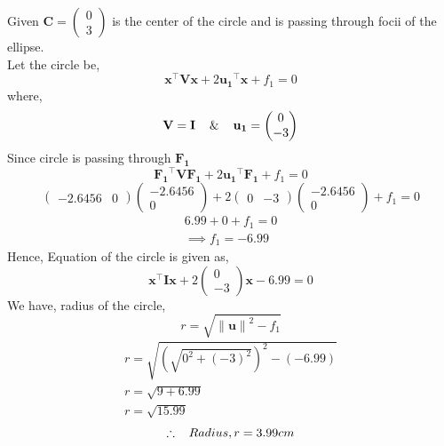 \documentclass[journal,10pt,twocolumn]{article}
\providecommand{\norm}[1]{\left\lVert#1\right\rVert}
\let\vec\mathbf
\newcommand{\myvec}[1]{\ensuremath{\begin{pmatrix}#1\end{pmatrix}}}
\providecommand{\brak}[1]{\ensuremath{\left(#1\right)}}
\begin{document}
{Given $\vec{C} = \myvec{0 \\ 3}$ is the center of the circle and is passing through focii of the ellipse.\\
Let the circle be,
\begin{equation}
\vec{x}^{\top}\vec{V}\vec{x}+2\vec{u_1}^{\top}\vec{x}+f_1=0
\label{eq-16-}
\end{equation}
where, 
\begin{equation}
\vec{V} = \vec{I} \hspace{4mm} \& \hspace{4mm} \vec{u_1} = \myvec{0 \\ -3}
\end{equation}
Since circle is passing through $\vec{F_1}$
\begin{equation}
\vec{F_1}^{\top}\vec{V}\vec{F_1}+2\vec{u_1}^{\top}\vec{F_1}+f_1=0 
\label{eq-18-}
\end{equation} \vspace{1mm}
\begin{equation}
\myvec{-2.6456 & 0} \myvec{-2.6456 \\ 0} +  2\myvec{0 & -3}\myvec{-2.6456 \\ 0} +  f_1 = 0 
\end{equation}
\begin{gather*}
6.99 + 0 +  f_1 = 0 \\
\implies f_1 = -6.99
\end{gather*}
Hence, Equation of the circle is given as,
\begin{equation}
\vec{x}^{\top}\vec{I}\vec{x}+2\myvec{0 \\ -3}\vec{x}-6.99=0
\label{eq-20-}
\end{equation}
We have, radius of the circle,
\begin{equation}
r = \sqrt{\norm{\vec{u}}^2-f_1}
\label{eq-21-}
\end{equation}
\begin{gather*}
r = \sqrt{\brak{\sqrt{0^2 + (-3)^2}}^2-(-6.99)} \\
r = \sqrt{9+6.99} \\
r = \sqrt{15.99}
\end{gather*}
\begin{equation}
\therefore \hspace{3mm} Radius, r = 3.99 cm
\label{eq-22-}
\end{equation}


}
\end{document}
